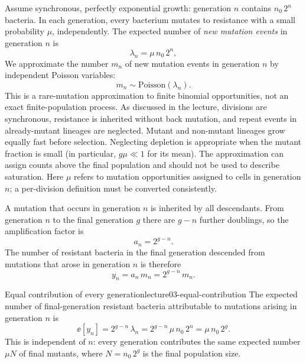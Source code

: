 Assume synchronous, perfectly exponential growth: generation $n$ contains $n_0\,2^{n}$ bacteria. In each generation, every bacterium mutates to resistance with a small probability $\mu$, independently. The expected number of \emph{new mutation events} in generation $n$ is
\begin{equation}\label{eq:lecture03-lambda-n}
\lambda_n = \mu\,n_0\,2^{n},
\end{equation}
We approximate the number $m_n$ of new mutation events in generation $n$ by independent Poisson variables:
\begin{equation}\label{eq:lecture03-mn-poisson}
m_n \sim \mathrm{Poisson}(\lambda_n).
\end{equation}
This is a rare-mutation approximation to finite binomial opportunities, not an exact finite-population process. As discussed in the lecture, divisions are synchronous, resistance is inherited without back mutation, and repeat events in already-mutant lineages are neglected. Mutant and non-mutant lineages grow equally fast before selection. Neglecting depletion is appropriate when the mutant fraction is small (in particular, $g\mu\ll1$ for its mean). The approximation can assign counts above the final population and should not be used to describe saturation. Here $\mu$ refers to mutation opportunities assigned to cells in generation $n$; a per-division definition must be converted consistently.

A mutation that occurs in generation $n$ is inherited by all descendants. From generation $n$ to the final generation $g$ there are $g-n$ further doublings, so the amplification factor is
\begin{equation}\label{eq:lecture03-amplification}
a_n = 2^{g-n}.
\end{equation}
The number of resistant bacteria in the final generation descended from mutations that arose in generation $n$ is therefore
\begin{equation}\label{eq:lecture03-yn-def}
y_n = a_n\,m_n = 2^{g-n}\,m_n .
\end{equation}

\begin{proposition}{Equal contribution of every generation}{lecture03-equal-contribution}
The expected number of final-generation resistant bacteria attributable to mutations arising in generation $n$ is
\begin{equation}\label{eq:lecture03-equal-contribution}
\ee[y_n] = 2^{g-n}\,\lambda_n
= 2^{g-n}\,\mu\,n_0\,2^{n}
= \mu\,n_0\,2^{g}.
\end{equation}
This is independent of $n$: every generation contributes the same expected number $\mu N$ of final mutants, where $N=n_0\,2^{g}$ is the final population size.
\end{proposition}

